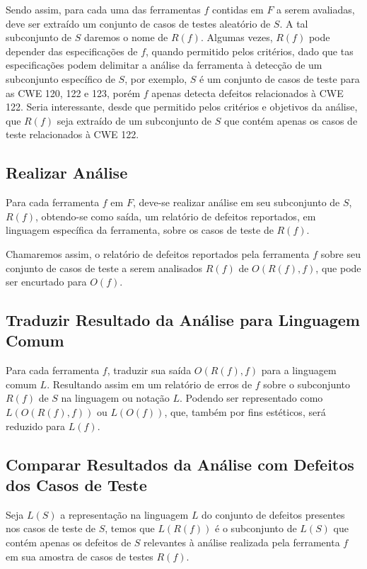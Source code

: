 Sendo assim, para cada uma das ferramentas $f$ contidas em $F$ a serem avaliadas,  deve ser extraído um conjunto de casos de testes aleatório de $S$. A tal subconjunto de $S$ daremos o nome de $R(f)$. Algumas vezes, $R(f)$ pode depender das especificações de $f$, quando permitido pelos critérios, dado que tas especificações podem delimitar a análise da ferramenta à detecção de um subconjunto específico de $S$, por exemplo, $S$ é um conjunto de casos de teste para as CWE 120, 122 e 123, porém $f$ apenas detecta defeitos relacionados à CWE 122. Seria interessante, desde que permitido pelos critérios e objetivos da análise, que $R(f)$ seja extraído de um subconjunto de $S$ que contém apenas os casos de teste relacionados à CWE 122.

\subsection{Realizar Análise}

Para cada ferramenta $f$ em $F$, deve-se realizar análise em seu subconjunto de $S$, $R(f)$, obtendo-se como saída, um relatório de defeitos reportados, em linguagem específica da ferramenta, sobre os casos de teste de $R(f)$.

Chamaremos assim, o relatório de defeitos reportados pela ferramenta $f$ sobre seu conjunto de casos de teste a serem analisados $R(f)$ de $O(R(f), f)$, que pode ser encurtado para $O(f)$.

\subsection{Traduzir Resultado da Análise para Linguagem Comum}

Para cada ferramenta $f$, traduzir sua saída $O(R(f), f)$ para a linguagem comum $L$. Resultando assim em um relatório de erros de $f$ sobre o subconjunto $R(f)$ de $S$ na linguagem ou notação $L$. Podendo ser representado como $L(O(R(f), f))$ ou $L(O(f))$, que, também por fins estéticos, será reduzido para $L(f)$.

\subsection{Comparar Resultados da Análise com Defeitos dos Casos de  Teste}

Seja $L(S)$ a representação na linguagem $L$ do conjunto de defeitos presentes nos casos de teste de $S$, temos que $L(R(f))$ é o subconjunto de $L(S)$ que contém apenas os defeitos de $S$ relevantes à análise realizada pela ferramenta $f$ em sua amostra de casos de testes $R(f)$.

